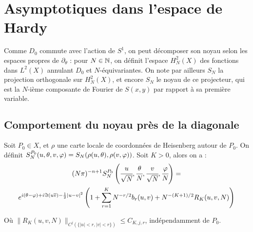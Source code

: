 \section{Asymptotiques dans l'espace de Hardy}

Comme $D_0$ commute avec l'action de $S^1$, on peut décomposer son noyau selon les espaces propres de $\partial_{\theta}$ : pour $N \in \mathbb{N}$, on définit l'espace $H^2_N(X)$ des fonctions dans $L^2(X)$ annulant $D_0$ et $N$-équivariantes. On note par ailleurs  $S_N$ la projection orthogonale sur $H^2_N(X)$, et encore $S_N$ le noyau de ce projecteur, qui est la $N$-ième composante de Fourier de $S(x,y)$ par rapport à sa première variable.

\subsection{Comportement du noyau près de la diagonale}

\begin{theorem}
	Soit $P_0 \in X$, et $\rho$ une carte locale de coordonnées de Heisenberg autour de $P_0$. On définit $S_N^{P_0}(u,\theta,v,\varphi) = S_N(\rho(u,\theta), \rho(v,\varphi))$. Soit $K>0$, alors on a :
	\begin{multline*}
	(N\pi)^{-n+1}S_N^{P_0}\left(\cfrac{u}{\sqrt{N}},\cfrac{\theta}{N}, \cfrac{v}{\sqrt{N}}, \cfrac{\varphi}{N}\right) = \\e^{i(\theta-\varphi) + i \Im(u\overline{v}) - \frac12 |u-v|^2}\left(1+\sum_{r=1}^K N^{-r/2}b_r(u,v) + N^{-(K+1)/2}R_K(u,v,N)\right)
	\end{multline*}
	
	Où $\|R_K(u,v,N)\|_{C^j(\{|u| < r, |v| < r\})} \leq C_{K,j,r}$, indépendamment de $P_0$.
\end{theorem}

